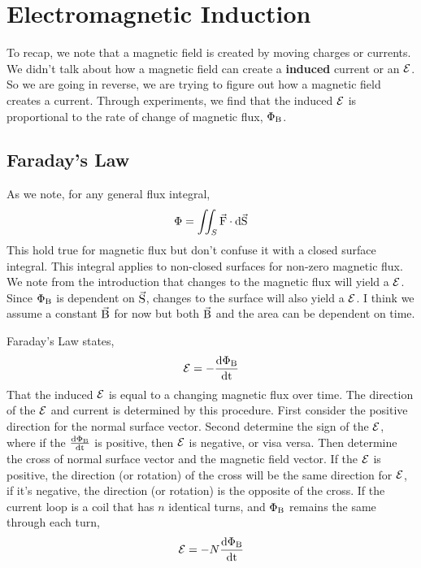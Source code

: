 \chapter{Electromagnetic Induction}
To recap, we note that a magnetic field is created by moving charges or currents. We didn't talk about how a magnetic field can create a \textbf{induced} current or an $\mathcal{E}$. So we are going in reverse, we are trying to figure out how a magnetic field creates a current. Through experiments, we find that the induced $\mathcal{E}$ is proportional to the rate of change of magnetic flux, $\Phi_{\mathrm{B}}$.

\section{Faraday's Law}
As we note, for any general flux integral, 
\begin{equation*}
	\Phi = \iint_{S} \vec{\mathrm{F}} \cdot \mathrm{d}\vec{\mathrm{S}}
\end{equation*}
This hold true for magnetic flux but don't confuse it with a closed surface integral. This integral applies to non-closed surfaces for non-zero magnetic flux. We note from the introduction that changes to the magnetic flux will yield a $\mathcal{E}$. Since $\Phi_{\mathrm{B}}$ is dependent on $\vec{\mathrm{S}}$, changes to the surface will also yield a $\mathcal{E}$. I think we assume a constant $\vec{\mathrm{B}}$ for now but both $\vec{\mathrm{B}}$ and the area can be dependent on time.  

Faraday's Law states,
\begin{equation*}
	\mathcal{E} = -\frac{\mathrm{d \Phi_{\mathrm{B}}}}{\mathrm{d t}}
\end{equation*}
That the induced $\mathcal{E}$ is equal to a changing magnetic flux over time. The direction of the $\mathcal{E}$ and current is determined by this procedure. First consider the positive direction for the normal surface vector. Second determine the sign of the $\mathcal{E}$, where if the $\frac{\mathrm{d \Phi_{\mathrm{B}}}}{\mathrm{d t}}$ is positive, then $\mathcal{E}$ is negative, or visa versa. Then determine the cross of normal surface vector and the magnetic field vector. If the $\mathcal{E}$ is positive, the direction (or rotation) of the cross will be the same direction for 
$\mathcal{E}$, if it's negative, the direction (or rotation) is the opposite of the cross. If the current loop is a coil that has $n$ identical turns, and $\Phi_{\mathrm{B}}$ remains the same through each turn, 
\begin{equation*}
	\mathcal{E} = -N\frac{\mathrm{d \Phi_{\mathrm{B}}}}{\mathrm{d t}}
\end{equation*}
